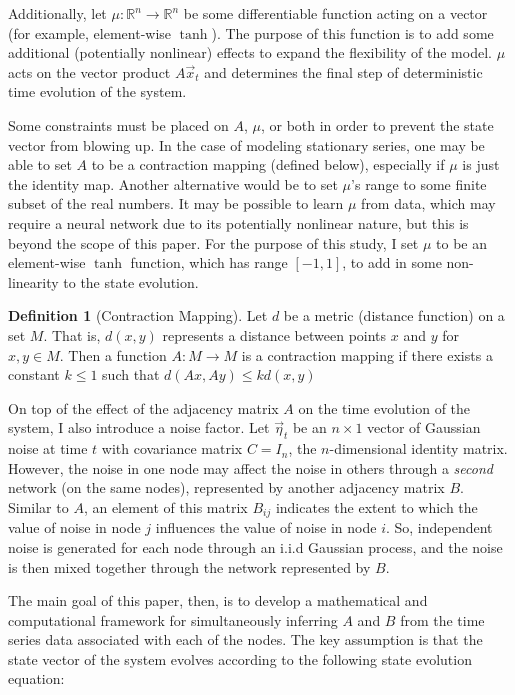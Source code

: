 \documentclass[12pt]{article}
\theoremstyle{definition}
\newtheorem{definition}{Definition}[section]
\begin{document}
Additionally, let $\mu: \mathbb{R}^n \longrightarrow \mathbb{R}^n$ be some differentiable function acting on a vector (for example, element-wise $\tanh$). The purpose of this function is to add some additional (potentially nonlinear) effects to expand the flexibility of the model. $\mu$ acts on the vector product $A\vec{x}_t$ and determines the final step of deterministic time evolution of the system.

Some constraints must be placed on $A$, $\mu$, or both in order to prevent the state vector from blowing up. In the case of modeling stationary series, one may be able to set $A$ to be a contraction mapping (defined below), especially if $\mu$ is just the identity map. Another alternative would be to set $\mu$'s range to some finite subset of the real numbers. It may be possible to learn $\mu$ from data, which may require a neural network due to its potentially nonlinear nature, but this is beyond the scope of this paper. For the purpose of this study, I set $\mu$ to be an element-wise $\tanh$ function, which has range $[-1, 1]$, to add in some non-linearity to the state evolution.

\begin{definition}[Contraction Mapping]
Let $d$ be a metric (distance function) on a set $M$. That is, $d(x,y)$ represents a distance between points $x$ and $y$ for $x, y \in M$. Then a function $A: M \rightarrow M$ is a contraction mapping if there exists a constant $k \leq 1$ such that $d(Ax, Ay) \leq k d(x, y)$
\end{definition}

On top of the effect of the adjacency matrix $A$ on the time evolution of the system, I also introduce a noise factor. Let $\Vec{\eta}_t$ be an $n \times 1$ vector of Gaussian noise at time $t$ with covariance matrix $C = I_n$, the $n$-dimensional identity matrix. However, the noise in one node may affect the noise in others through a \textit{second} network (on the same nodes), represented by another adjacency matrix $B$. Similar to $A$, an element of this matrix $B_{ij}$ indicates the extent to which the value of noise in node $j$ influences the value of noise in node $i$. So, independent noise is generated for each node through an i.i.d Gaussian process, and the noise is then mixed together through the network represented by $B$.

The main goal of this paper, then, is to develop a mathematical and computational framework for simultaneously inferring $A$ and $B$ from the time series data associated with each of the nodes. The key assumption is that the state vector of the system evolves according to the following state evolution equation:
\end{document}
